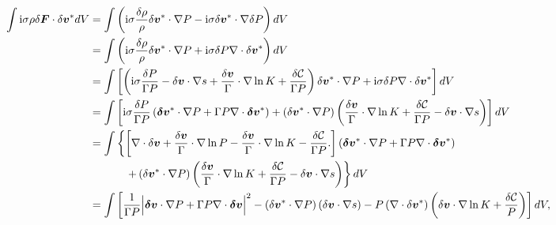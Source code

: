 \begin{align}
  \int \ii\sigma\rho \dd \bm{F}\cdot\dd\bm{v}^*dV &=\int\left( \ii\sigma \frac{\dd
    \rho}{\rho}\dd\bm{v}^*\cdot \nabla P - \ii\sigma \dd
  \bm{v}^*\cdot\nabla \dd P  \right)dV\notag\\
&= \int\left( \ii\sigma \frac{\dd
    \rho}{\rho}\dd\bm{v}^*\cdot\nabla P + \ii\sigma \dd
 P  \nabla\cdot \dd \bm{v}^*  \right)dV\notag\\
 & = \int\left[
   \left(
   \ii\sigma \frac{\dd P}{\Gamma P} - \dd\bm{v}\cdot\nabla s + \frac{\dd
   \bm{v}}{\Gamma} \cdot \nabla \ln{K} +
   \frac{\dd\mathcal{C}}{\Gamma P} \right)\dd\bm{v}^*\cdot\nabla P
   + \ii\sigma \dd P  \nabla\cdot \dd \bm{v}^*
   \right]dV\notag\\
 & = \int\left[
   \ii\sigma\frac{\dd P}{\Gamma P}\left(\bm{\dd v}^*\cdot\nabla P +
   \Gamma P\nabla\cdot\bm{\delta v}^*   \right)
   +\left(\dd\bm{v}^*\cdot\nabla P\right) \left( \frac{\dd\bm{v}}{\Gamma} \cdot \nabla
   \ln{K} + \frac{\dd\mathcal{C}}{\Gamma P}   -  \dd\bm{v}\cdot\nabla s\right) 
   \right]dV\notag\\
 & = \int\left\{
 \left[
   \nabla\cdot\dd\bm{v} +
  \frac{\dd\bm{v}}{\Gamma}\cdot\nabla\ln{P} -
  \frac{\dd\bm{v}}{\Gamma}\cdot\nabla\ln{K} -
  \frac{\dd\mathcal{C}}{\Gamma P}. 
  \right]
 \left(\bm{\dd v}^*\cdot\nabla P +
 \Gamma P\nabla\cdot\bm{\delta v}^*   \right)\right. \notag\\
 &\phantom{=\int\left\{\right\}}\left. 
 + \left(\dd\bm{v}^*\cdot\nabla P\right)\left(\frac{\dd\bm{v}}{\Gamma} \cdot \nabla
 \ln{K}
 + \frac{\dd\mathcal{C}}{\Gamma P}   -  \dd\bm{v}\cdot\nabla s \right)
 \right\}dV \notag\\
 &=\int\left[
    \frac{1}{\Gamma P} \Bigl\lvert \bm{\dd v}\cdot\nabla P +
 \Gamma P\nabla\cdot\bm{\delta v}    \Bigr\rvert ^2 - 
     \left(\dd\bm{v}^*\cdot\nabla P\right)\left(\dd\bm{v}\cdot\nabla s
     \right) -
      P\left(\nabla\cdot\dd\bm{v}^*\right)\left(\dd\bm{v}\cdot\nabla\ln{K} + \frac{\dd\mathcal{C}}{P} \right) 
     \right]dV,
\end{align}
